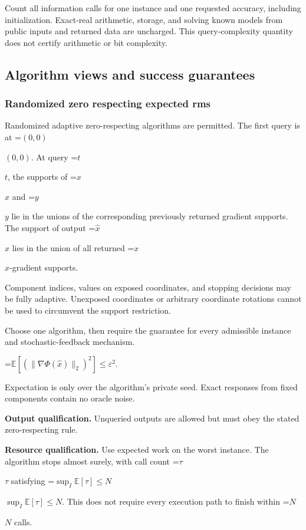 \documentclass[10pt,a4paper]{article}
\newcommand{\AtlasMath}[1]{\par\begingroup\centering\setbox0=\hbox{$\displaystyle #1$}\ifdim\wd0>1.4\linewidth\typeout{ATLAS WIDE FORMULA: \the\wd0}\fi\ifdim\wd0>\linewidth\resizebox{\linewidth}{!}{\box0}\else\box0\fi\par\endgroup}
\newcommand{\AtlasInlineMath}[1]{\begingroup\setbox0=\hbox{$#1$}\ifdim\wd0>.4\linewidth\endgroup\AtlasMath{#1}\else\endgroup$#1$\fi}
\begin{document}
Count all information calls for one instance and one requested accuracy, including initialization. Exact-real arithmetic, storage, and solving known models from public inputs and returned data are uncharged. This query-complexity quantity does not certify arithmetic or bit complexity.



\subsection{Algorithm views and success guarantees}


\subsubsection{Randomized zero respecting expected rms}


Randomized adaptive zero-respecting algorithms are permitted. The first query is at \AtlasInlineMath{(0,0)}. At query \AtlasInlineMath{t}, the supports of \AtlasInlineMath{x} and \AtlasInlineMath{y} lie in the unions of the corresponding previously returned gradient supports. The support of output \AtlasInlineMath{\widehat{x}} lies in the union of all returned \AtlasInlineMath{x}-gradient supports.



Component indices, values on exposed coordinates, and stopping decisions may be fully adaptive. Unexposed coordinates or arbitrary coordinate rotations cannot be used to circumvent the support restriction.



Choose one algorithm, then require the guarantee for every admissible instance and stochastic-feedback mechanism.




\AtlasMath{\mathbb{E}\!\left[\left(\|\nabla\Phi(\widehat{x})\|_2\right)^2\right]\le\varepsilon^2.}




Expectation is only over the algorithm's private seed. Exact responses from fixed components contain no oracle noise.



\textbf{Output qualification.} Unqueried outputs are allowed but must obey the stated zero-respecting rule.



\textbf{Resource qualification.} Use expected work on the worst instance. The algorithm stops almost surely, with call count \AtlasInlineMath{\tau} satisfying \AtlasInlineMath{\sup_I\mathbb{E}[\tau]\le N}. This does not require every execution path to finish within \AtlasInlineMath{N} calls.
\end{document}
